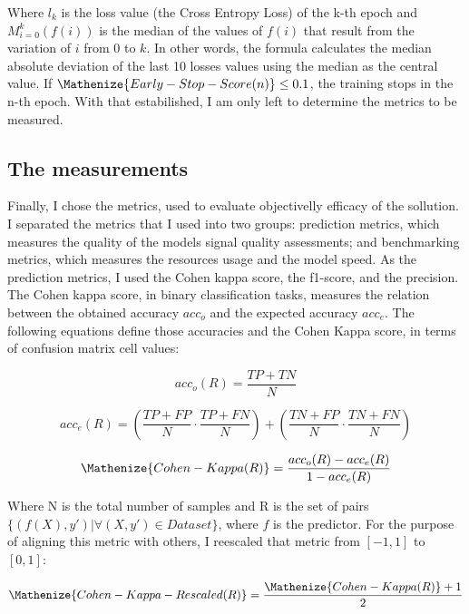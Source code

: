 \noindent Where $l_k$ is the loss value (the Cross Entropy Loss) of the k-th epoch and $M_{i=0}^k(f(i))$ is the median of the values of $f(i)$ that result from the variation of $i$ from $0$ to $k$. In other words, the formula calculates the median absolute deviation of the last 10 losses values using the median as the central value. If $\Mathenize{Early-Stop-Score(n)} \leq 0.1$, the training stops in the n-th epoch. With that estabilished, I am only left to determine the metrics to be measured.     

\subsection{The measurements}

Finally, I chose the metrics, used to evaluate objectivelly efficacy of the sollution. I separated the metrics that I used into two groups: prediction metrics, which measures the quality of the models signal quality assessments; and benchmarking metrics, which measures the resources usage and the model speed. As the prediction metrics, I used the Cohen kappa score, the f1-score, and the precision. The Cohen kappa score, in binary classification tasks, measures the relation between the obtained accuracy $acc_o$ and the expected accuracy $acc_e$. The following equations define those accuracies and the Cohen Kappa score, in terms of confusion matrix cell values:

\begin{equation} 
acc_o(R) = \frac{TP+TN}{N}
\end{equation}

\begin{equation}
acc_e(R)  = \left(\frac{TP+FP}{N} \cdot \frac{TP+FN}{N}\right) + \left(\frac{TN+FP}{N} \cdot \frac{TN+FN}{N}\right)
\end{equation}

\begin{equation} \label{eq:Cohen Kappa}
\Mathenize{Cohen-Kappa(R)}  = \frac{acc_o(R) - acc_e(R)}{1 - acc_e(R)} 
\end{equation}  

\noindent Where N is the total number of samples and R is the set of pairs $\{(f(X),y') | \forall (X,y') \in Dataset\}$, where $f$ is the predictor. For the purpose of aligning this metric with others, I reescaled that metric from $[-1,1]$ to $[0,1]$:

\begin{equation}
\Mathenize{Cohen-Kappa-Rescaled(R)} = \frac{\Mathenize{Cohen-Kappa(R)}+1}{2} 
\end{equation}  

